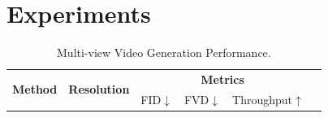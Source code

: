 \section{Experiments}


\begin{table}[t!]
\begin{minipage}[t]{\linewidth}
\caption{Multi-view Video Generation Performance.}
\label{tab:multiview}
\vspace{-10pt}
\centering
\begin{tabular}{lccccc}
\toprule
\multicolumn{1}{l}{\multirow{2}{*}{\textbf{Method}}} & \multirow{2}{*}{\textbf{Resolution}}& \multicolumn{3}{c}{\textbf{Metrics}}\\
& & FID$\downarrow$ & FVD$\downarrow$&Throughput$\uparrow$\\
\midrule

\end{tabular}
\end{minipage}
\end{table}
